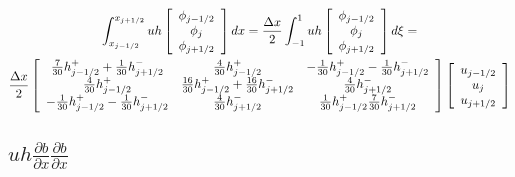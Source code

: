 \documentclass[12pt]{article}
\begin{document}
\begin{multline*}
\int_{x_{j-1/2}}^{x_{j+1/2}} uh \left[\begin{array}{c}\phi_{j-1/2} \\\phi_{j}\\\phi_{j+1/2} \end{array}\right] dx=  \frac{\Delta x}{2}\int_{-1}^{1} uh \left[\begin{array}{c}\phi_{j-1/2} \\\phi_{j}\\\phi_{j+1/2} \end{array}\right] d \xi =\\
\frac{\Delta x}{2}  
\left[\begin{array}{c c c } 
\frac{7}{30} h^+_{j - 1/2} + \frac{1}{30} h^-_{j + 1/2} & \frac{4}{30} h^+_{j - 1/2}  &  -\frac{1}{30} h^+_{j - 1/2} - \frac{1}{30} h^-_{j + 1/2}\\
\frac{4}{30} h^+_{j - 1/2} & \frac{16}{30} h^+_{j - 1/2} + \frac{16}{30} h^-_{j + 1/2}  &  \frac{4}{30} h^-_{j + 1/2}\\
-\frac{1}{30} h^+_{j - 1/2} - \frac{1}{30} h^-_{j + 1/2} & \frac{4}{30} h^-_{j + 1/2}  &  \frac{1}{30} h^+_{j - 1/2}  \frac{7}{30} h^-_{j + 1/2}\\
 \end{array}\right] \left[\begin{array}{c}u_{j-1/2} \\u_{j}\\u_{j+1/2} \end{array}\right]
\end{multline*}

\subsection{$uh \frac{\partial b}{\partial x} \frac{\partial b}{\partial x}$}
\end{document}
